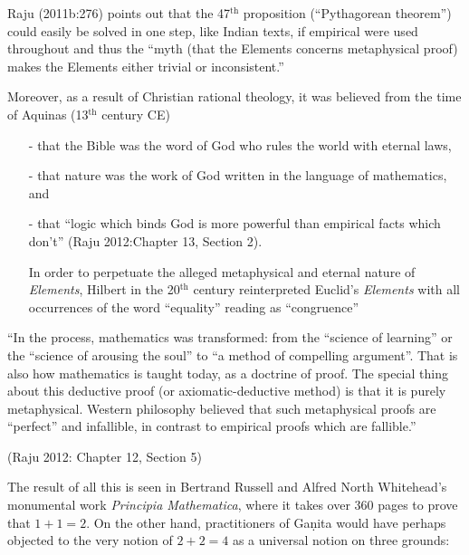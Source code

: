 Raju (2011b:276) points out that the 47$^{\text{th}}$ proposition (``Pythagorean theorem'') could easily be solved in one step, like Indian texts, if empirical were used throughout and thus the ``myth (that the Elements concerns metaphysical proof) makes the Elements either trivial or inconsistent.''

Moreover, as a result of Christian rational theology, it was believed from the time of Aquinas (13$^{\text{th}}$ century CE) 

\newpage

\begin{itemize}
\item[-] that the Bible was the word of God who rules the world with eternal laws,
\item[-] that nature was the work of God written in the language of mathematics, and 
\item[-] that ``logic which binds God is more powerful than empirical facts which don’t'' (Raju 2012:Chapter 13, Section 2). 

In order to perpetuate the alleged metaphysical and eternal nature of {\sl Elements}, Hilbert in the 20$^{\text{th}}$ century reinterpreted Euclid’s {\sl Elements} with all occurrences of the word ``equality'' reading as ``congruence''
\end{itemize}
\begin{myquote}
``In the process, mathematics was transformed: from the ``science of learning'' or the ``science of arousing the soul'' to ``a method of compelling argument''. That is also how mathematics is taught today, as a doctrine of proof. The special thing about this deductive proof (or axiomatic-deductive method) is that it is purely metaphysical. Western philosophy believed that such metaphysical proofs are ``perfect'' and infallible, in contrast to empirical proofs which are fallible.''

\hfill 	(Raju 2012: Chapter 12, Section 5)
\end{myquote}

The result of all this is seen in Bertrand Russell and Alfred North Whitehead's monumental work {\sl Principia Mathematica}, where it takes over 360 pages to prove that $1 + 1 = 2$. On the other hand, practitioners of Gaṇita would have perhaps objected to the very notion of $2 + 2 =4$ as a universal notion on three grounds:

